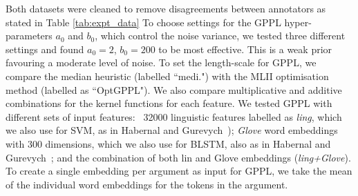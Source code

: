 Both datasets were cleaned to remove disagreements between annotators as stated in Table \ref{tab:expt_data}
To choose settings for the GPPL hyper-parameters $a_0$ and $b_0$, which control
the noise variance, we tested three different settings and found $a_0=2$, $b_0=200$
to be most effective. This is a weak prior favouring a moderate level of noise.
To set the length-scale for GPPL, we compare the median heuristic (labelled ``medi.")
with the MLII optimisation method (labelled as ``OptGPPL").
We also compare multiplicative and additive combinations for the kernel functions for each feature.
We tested GPPL with different sets of input features:
~32000 linguistic features labelled as \emph{ling}, which 
we also use for SVM, as in Habernal and Gurevych~);
\emph{Glove} word embeddings with 300 dimensions, which we also use for BLSTM, also as in Habernal and Gurevych~;
and the combination of both lin and Glove embeddings (\emph{ling+Glove}). 
To create a single embedding per argument as input for GPPL,
we take the mean of the individual word embeddings for the tokens in the argument.

